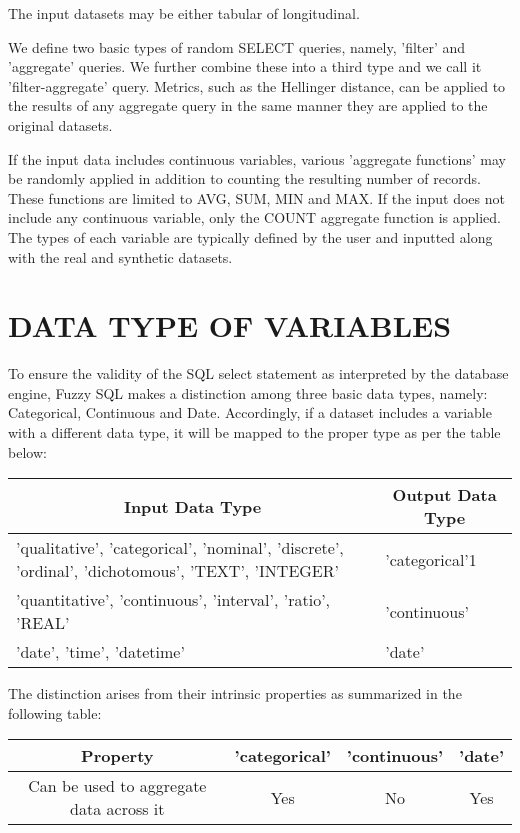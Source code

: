 \documentclass[10pt]{article}
\begin{document}
The input datasets may be either tabular of longitudinal.

We define two basic types of random SELECT queries, namely, 'filter' and 'aggregate' queries. We further combine these into a third type and we call it 'filter-aggregate' query. Metrics, such as the Hellinger distance, can be applied to the results of any aggregate query in the same manner they are applied to the original datasets.

If the input data includes continuous variables, various 'aggregate functions' may be randomly applied in addition to counting the resulting number of records. These functions are limited to AVG, SUM, MIN and MAX. If the input does not include any continuous variable, only the COUNT aggregate function is applied. The types of each variable are typically defined by the user and inputted along with the real and synthetic datasets.

\section{DATA TYPE OF VARIABLES}
To ensure the validity of the SQL select statement as interpreted by the database engine, Fuzzy SQL makes a distinction among three basic data types, namely: Categorical, Continuous and Date. Accordingly, if a dataset includes a variable with a different data type, it will be mapped to the proper type as per the table below:

\begin{tabular}{|l|l|}
\hline
\multicolumn{1}{|c|}{Input Data Type} & \multicolumn{1}{|c|}{Output Data Type} \\
\hline
'qualitative', 'categorical', 'nominal', 'discrete', 'ordinal', 'dichotomous', 'TEXT', 'INTEGER' & 'categorical'1 \\
\hline
'quantitative', 'continuous', 'interval', 'ratio', 'REAL' & 'continuous' \\
\hline
'date', 'time', 'datetime' & 'date' \\
\hline
\end{tabular}

The distinction arises from their intrinsic properties as summarized in the following table:

\begin{tabular}{|c|c|c|c|}
\hline
Property & 'categorical' & 'continuous' & 'date' \\
\hline
Can be used to aggregate data across it & Yes & No & Yes \\
\hline
\end{tabular}
\end{document}
